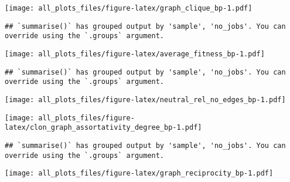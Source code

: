 \documentclass[
]{article}
\begin{document}
\texttt{[image: all\_plots\_files/figure-latex/graph\_clique\_bp-1.pdf]}

\begin{verbatim}
## `summarise()` has grouped output by 'sample', 'no_jobs'. You can override using the `.groups` argument.
\end{verbatim}

\texttt{[image: all\_plots\_files/figure-latex/average\_fitness\_bp-1.pdf]}

\begin{verbatim}
## `summarise()` has grouped output by 'sample', 'no_jobs'. You can override using the `.groups` argument.
\end{verbatim}

\texttt{[image: all\_plots\_files/figure-latex/neutral\_rel\_no\_edges\_bp-1.pdf]}

\texttt{[image: all\_plots\_files/figure-latex/clon\_graph\_assortativity\_degree\_bp-1.pdf]}

\begin{verbatim}
## `summarise()` has grouped output by 'sample', 'no_jobs'. You can override using the `.groups` argument.
\end{verbatim}

\texttt{[image: all\_plots\_files/figure-latex/graph\_reciprocity\_bp-1.pdf]}
\end{document}
